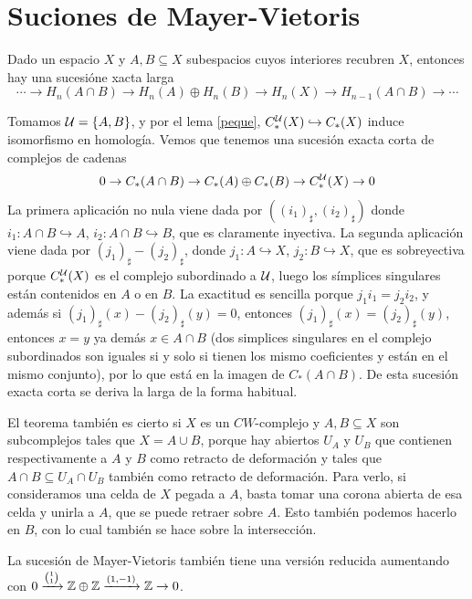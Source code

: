 \documentclass[TA.tex]{subfiles}
\begin{document}
\section{Suciones de Mayer-Vietoris}
\begin{teorema}
Dado un espacio $X$ y $A,B\subseteq X$ subespacios cuyos interiores recubren $X$, entonces hay una sucesióne xacta larga
\[
\cdots\to H_n(A\cap B)\to H_n(A)\oplus H_n(B)\to H_n(X)\to H_{n-1}(A\cap B)\to\cdots
\]
\end{teorema}
\begin{dem}
 Tomamos $\mathcal{U}=\{A,B\}$, y por el lema \ref{peque}, $C^{\mathcal{U}}_*(X)\hookrightarrow C_*(X)$ induce isomorfismo en homología. Vemos que tenemos una sucesión exacta corta de complejos de cadenas
 \[
 0\to C_*(A\cap B)\to C_*(A)\oplus C_*(B)\to C_*^{\mathcal{U}}(X)\to 0
 \]
La primera aplicación no nula viene dada por $((i_1)_\sharp, (i_2)_\sharp)$ donde $i_1:A\cap B\hookrightarrow A$, $i_2:A\cap B\hookrightarrow B$, que es claramente inyectiva. La segunda aplicación viene dada por $(j_1)_\sharp-(j_2)_\sharp$, donde $j_1:A\hookrightarrow X$, $j_2:B\hookrightarrow X$, que es sobreyectiva porque $C_*^{\mathcal{U}}(X)$ es el complejo subordinado a $\mathcal{U}$, luego los símplices singulares están contenidos en $A$ o en $B$. La exactitud es sencilla porque $j_1i_1=j_2i_2$, y además si $(j_1)_\sharp(x)-(j_2)_\sharp(y)=0$, entonces $(j_1)_\sharp(x)=(j_2)_\sharp(y)$, entonces $x=y$ ya demás $x\in A\cap B$ (dos simplices singulares en el complejo subordinados son iguales si y solo si tienen los mismo coeficientes y están en el mismo conjunto), por lo que está en la imagen de $C_*(A\cap B)$. De esta sucesión exacta corta se deriva la larga de la forma habitual.
\end{dem}

\begin{nota}
El teorema también es cierto si $X$ es un $CW$-complejo y $A,B\subseteq X$ son subcomplejos tales que $X=A\cup B$, porque hay abiertos $U_A$ y $U_B$ que contienen respectivamente a $A$ y $B$ como retracto de deformación y tales que $A\cap B\subseteq U_A\cap U_B$ también como retracto de deformación. Para verlo, si consideramos una celda de $X$ pegada a $A$, basta tomar una corona abierta de esa celda y unirla a $A$, que se puede retraer sobre $A$. Esto también podemos hacerlo en $B$, con lo cual también se hace sobre la intersección. 
\end{nota}

La sucesión de Mayer-Vietoris también tiene una versión reducida aumentando con $0\xrightarrow{\binom{1}{1}}\mathbb{Z}\oplus\mathbb{Z}\xrightarrow{(1,-1)}\mathbb{Z}\to 0$. 
\end{document}
